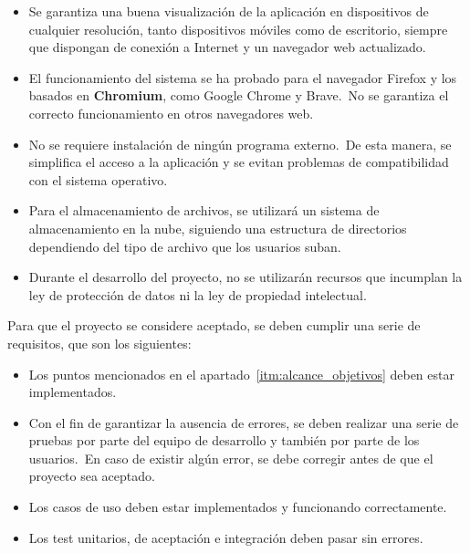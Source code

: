 \begin{itemize}
	\item Se garantiza una buena visualización de la aplicación en dispositivos de cualquier resolución, tanto
	dispositivos móviles como de escritorio, siempre que dispongan de conexión a Internet y un navegador web
	actualizado.
	\item El funcionamiento del sistema se ha probado para el navegador Firefox y los basados en \textbf{Chromium},
	como Google Chrome y Brave.\ No se garantiza el correcto funcionamiento en otros navegadores web.
	\item No se requiere instalación de ningún programa externo.\ De esta manera, se
	simplifica el acceso a la aplicación y se evitan problemas de compatibilidad con el sistema operativo.
	\item Para el almacenamiento de archivos, se utilizará un sistema de almacenamiento en la nube, siguiendo
	una estructura de directorios dependiendo del tipo de archivo que los usuarios suban.
	\item Durante el desarrollo del proyecto, no se utilizarán recursos que incumplan la ley de protección de
	datos ni la ley de propiedad intelectual.
\end{itemize}
\label{itm:alcance_limitaciones}


Para que el proyecto se considere aceptado, se deben cumplir una serie de requisitos, que son los siguientes:

\begin{itemize}
	\item Los puntos mencionados en el apartado~\ref{itm:alcance_objetivos} deben estar implementados.
	\item Con el fin de garantizar la ausencia de errores, se deben realizar una serie de pruebas por parte del equipo
	de desarrollo y también por parte de los usuarios.\ En caso de existir algún error, se debe corregir antes de
	que el proyecto sea aceptado.
	\item Los casos de uso deben estar implementados y funcionando correctamente.
	\item Los test unitarios, de aceptación e integración deben pasar sin errores.
\end{itemize}
\label{itm:alcance_criterios_aceptacion}
